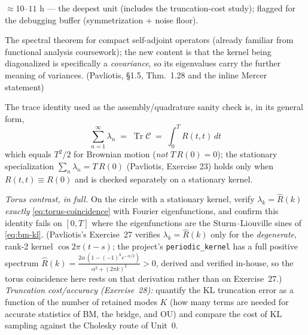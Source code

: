 \documentclass[11pt]{article}
\newcommand{\pav}[1]{{\small\color{hubblue}(Pavliotis, #1)}}
\newenvironment{unitmeta}{%
  \begin{description}[style=sameline,leftmargin=1.4cm,font=\bfseries\color{hubblue}]
}{%
  \end{description}
}
\begin{document}
\begin{unitmeta}
\item[Effort] $\approx 10$--$11$ h --- the deepest unit (includes the truncation-cost study); flagged for the debugging buffer (symmetrization + noise floor).
\item[Prerequisite] The spectral theorem for compact self-adjoint operators (already familiar from functional analysis coursework); the new content is that the kernel being diagonalized is specifically a \emph{covariance}, so its eigenvalues carry the further meaning of variances. \pav{\S1.5, Thm.~1.28 and the inline Mercer statement}
\end{unitmeta}

\noindent The trace identity used as the assembly/quadrature sanity check is, in its general form,
\begin{equation}
\sum_{n=1}^{\infty}\lambda_n \;=\; \operatorname{Tr}\mathcal{C} \;=\; \int_0^T R(t,t)\,dt
\label{eq:trace}
\end{equation}
which equals $T^2/2$ for Brownian motion (\emph{not} $T\,R(0)=0$); the stationary specialization $\sum_n\lambda_n=T\,R(0)$ \pav{Exercise 23} holds only when $R(t,t)\equiv R(0)$ and is checked separately on a stationary kernel.

\noindent\emph{Torus contrast, in full.} On the circle with a stationary kernel, verify $\lambda_k = \hat R(k)$ \emph{exactly} \eqref{eq:torus-coincidence} with Fourier eigenfunctions, and confirm this identity fails on $[0,T]$ where the eigenfunctions are the Sturm--Liouville sines of \eqref{eq:bm-kl}. (Pavliotis's Exercise~27 verifies $\lambda_k=\hat R(k)$ only for the \emph{degenerate}, rank-2 kernel $\cos 2\pi(t-s)$; the project's \texttt{periodic\_kernel} has a full positive spectrum $\hat R(k)=\tfrac{2\alpha\,(1-(-1)^k e^{-\alpha/2})}{\alpha^2+(2\pi k)^2}>0$, derived and verified in-house, so the torus coincidence here rests on that derivation rather than on Exercise~27.) \emph{Truncation cost/accuracy (Exercise~28):} quantify the KL truncation error as a function of the number of retained modes $K$ (how many terms are needed for accurate statistics of BM, the bridge, and OU) and compare the cost of KL sampling against the Cholesky route of Unit~0.
\end{document}
